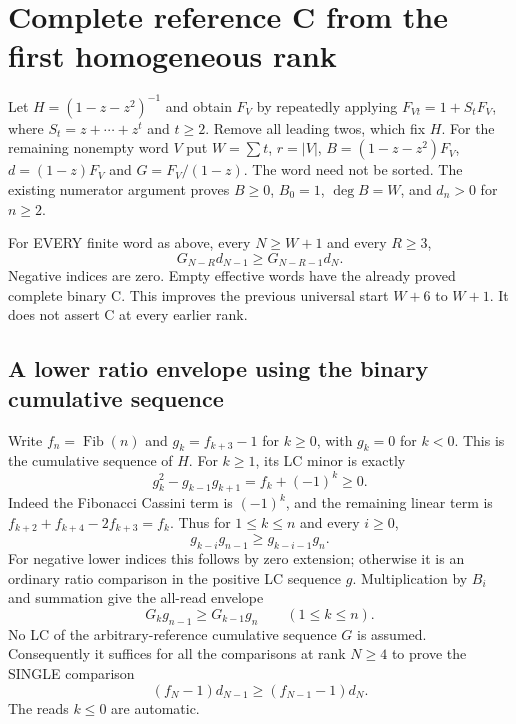 \section{Complete reference C from the first homogeneous rank}
Let $H=(1-z-z^2)^{-1}$ and obtain $F_V$ by repeatedly applying
$F_{Vt}=1+S_tF_V$, where $S_t=z+\cdots+z^t$ and $t\ge2$.
Remove all leading twos, which fix $H$. For the remaining nonempty
word $V$ put $W=\sum t$, $r=|V|$, $B=(1-z-z^2)F_V$,
$d=(1-z)F_V$ and $G=F_V/(1-z)$. The word need not be sorted.
The existing numerator argument proves $B\ge0$, $B_0=1$,
$\deg B=W$, and $d_n>0$ for $n\ge2$.

\begin{theorem}
For EVERY finite word as above, every $N\ge W+1$ and every $R\ge3$,
\[
                    G_{N-R}d_{N-1}\ge G_{N-R-1}d_N.       \tag{1}
\]
Negative indices are zero. Empty effective words have the already
proved complete binary C. This improves the previous universal
start $W+6$ to $W+1$. It does not assert C at every earlier rank.
\end{theorem}

\subsection*{A lower ratio envelope using the binary cumulative sequence}
Write $f_n=\operatorname{Fib}(n)$ and $g_k=f_{k+3}-1$ for $k\ge0$,
with $g_k=0$ for $k<0$. This is the cumulative sequence of $H$.
For $k\ge1$, its LC minor is exactly
\[
                   g_k^2-g_{k-1}g_{k+1}=f_k+(-1)^k\ge0. \tag{2}
\]
Indeed the Fibonacci Cassini term is $(-1)^k$, and the remaining
linear term is $f_{k+2}+f_{k+4}-2f_{k+3}=f_k$.
Thus for $1\le k\le n$ and every $i\ge0$,
\[
                 g_{k-i}g_{n-1}\ge g_{k-i-1}g_n.
\]
For negative lower indices this follows by zero extension; otherwise
it is an ordinary ratio comparison in the positive LC sequence $g$.
Multiplication by $B_i$ and summation give the all-read envelope
\[
                  G_k g_{n-1}\ge G_{k-1}g_n
                            \qquad(1\le k\le n).        \tag{3}
\]
No LC of the arbitrary-reference cumulative sequence $G$ is assumed.
Consequently it suffices for all the comparisons at rank $N\ge4$
to prove the SINGLE comparison
\[
           (f_N-1)d_{N-1}\ge(f_{N-1}-1)d_N.              \tag{4}
\]
The reads $k\le0$ are automatic.


